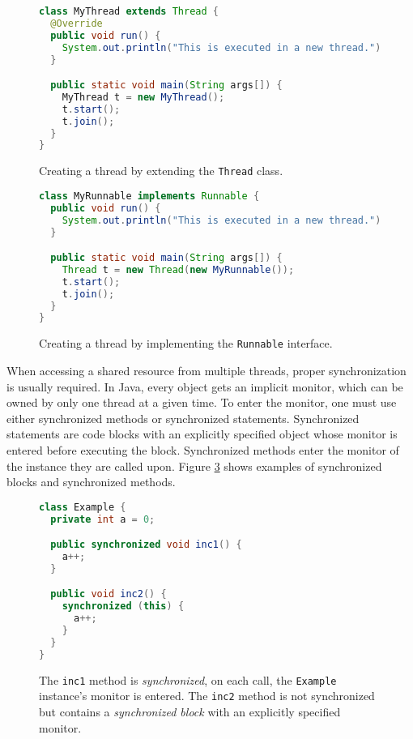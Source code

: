 \begin{figure}[hbt]
    \label{threadExtend}
\begin{lstlisting}[language=java]
class MyThread extends Thread {
  @Override
  public void run() {
    System.out.println("This is executed in a new thread.");
  }

  public static void main(String args[]) {
    MyThread t = new MyThread();
    t.start();
    t.join();
  }
}
\end{lstlisting}
    \caption{Creating a thread by extending the \texttt{Thread} class.}
\end{figure}

\begin{figure}[hbt]
    \label{threadRunnable}
\begin{lstlisting}[language=java]
class MyRunnable implements Runnable {
  public void run() {
    System.out.println("This is executed in a new thread.");
  }

  public static void main(String args[]) {
    Thread t = new Thread(new MyRunnable());
    t.start();
    t.join();
  }
}
\end{lstlisting}
    \caption{Creating a thread by implementing the \texttt{Runnable} interface.}
\end{figure}

When accessing a shared resource from multiple threads, proper synchronization
is usually required. In Java, every object gets an implicit monitor, which can
be owned by only one thread at a given time. To enter the monitor, one must use
either synchronized methods or synchronized statements. Synchronized statements
are code blocks with an explicitly specified object whose monitor is entered
before executing the block. Synchronized methods enter the monitor of the
instance they are called upon. Figure \ref{synchronized} shows examples of
synchronized blocks and synchronized methods.

\begin{figure}[hbt]
    \label{synchronized}
\begin{lstlisting}[language=java]
class Example {
  private int a = 0;

  public synchronized void inc1() {
    a++;
  }

  public void inc2() {
    synchronized (this) {
      a++;
    }
  }
}
\end{lstlisting}
    \caption{The \texttt{inc1} method is \emph{synchronized}, on each call, the
    \texttt{Example} instance's monitor is entered. The \texttt{inc2} method is
    not synchronized but contains a \emph{synchronized block} with an explicitly
    specified monitor.}
\end{figure}

